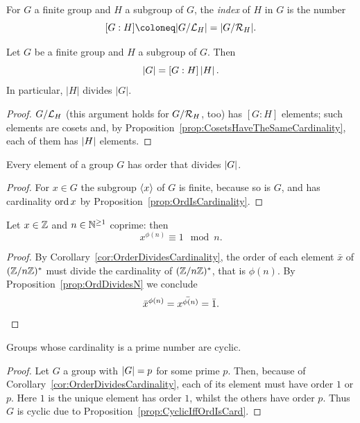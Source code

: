\begin{definition}
For \(G\) a finite group and \(H\) a subgroup of \(G\), the {\em index} of \(H\) in \(G\) is the number
\[[G:H] \coloneq \lvert G/\call_H \rvert = \lvert G/\calr_H \rvert.\]
\end{definition}

\begin{proposition}\label{prop:LagrangesTheorem}
Let \(G\) be a finite group and \(H\) a subgroup of \(G\). Then
\[\left\lvert G\right\rvert = [G:H] \left\lvert H\right\rvert .\]
In particular, \(\lvert H \rvert\) divides \(\lvert G \rvert\).
\end{proposition}

\begin{proof}
\(G/\mathcal L_H\) (this argument holds for \(G/\mathcal R_H\), too) has \([G:H]\) elements; such elements are cosets and, by Proposition~\ref{prop:CosetsHaveTheSameCardinality}, each of them has \(\left\lvert H\right\rvert\) elements.
\end{proof}

\begin{corollary}\label{cor:OrderDividesCardinality}
Every element of a group \(G\) has order that divides \(\left\lvert G\right\rvert\).
\end{corollary}

\begin{proof}
For \(x \in G\) the subgroup \(\left\langle x\right\rangle\) of \(G\) is finite, because so is \(G\), and has cardinality \(\operatorname{ord} x\) by Proposition~\ref{prop:OrdIsCardinality}.
\end{proof}

\begin{corollary}
Let \(x \in \mathbb Z\) and \(n \in \mathbb N^{\ge 1}\) coprime: then
\[x^{\phi(n)} \equiv 1 \mod n .\]
\end{corollary}

\begin{proof}
By Corollary~\ref{cor:OrderDividesCardinality}, the order of each element \(\bar x\) of \((\mathbb Z/n\mathbb Z)^*\) must divide the cardinality of \((\mathbb Z/n\mathbb Z)^*\), that is \(\phi(n)\). By Proposition~\ref{prop:OrdDividesN} we conclude
\[\bar x^{\phi(n)} = \bar{x^{\phi(n)}} = \bar 1 .\qedhere\]
\end{proof}

\begin{corollary}\label{cor:GroupsWithPrimeCardAreCyclic}
Groups whose cardinality is a prime number are cyclic.
\end{corollary}

\begin{proof}
Let \(G\) a group with \(\left\lvert G\right\rvert = p\) for some prime \(p\). Then, because of Corollary~\ref{cor:OrderDividesCardinality}, each of its element must have order \(1\) or \(p\). Here \(1\) is the unique element has order \(1\), whilst the others have order \(p\). Thus \(G\) is cyclic due to Proposition~\ref{prop:CyclicIffOrdIsCard}.
\end{proof}

